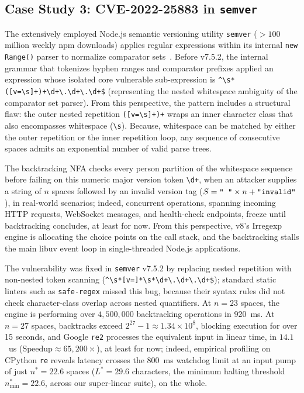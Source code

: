 \documentclass{ieeeaccess}
\begin{document}
\subsection{Case Study 3: CVE-2022-25883 in \texttt{semver}}
The extensively employed Node.js semantic versioning utility \texttt{semver} ($>100$ million weekly npm downloads) applies regular expressions within its internal \texttt{new Range()} parser to normalize comparator sets~\cite{cve_2022_25883}. Before v7.5.2, the internal grammar that tokenizes hyphen ranges and comparator prefixes applied an expression whose isolated core vulnerable sub-expression is \texttt{\^{}\textbackslash s*([v=\textbackslash s]+)+\textbackslash d+\textbackslash .\textbackslash d+\textbackslash .\textbackslash d+\$} (representing the nested whitespace ambiguity of the comparator set parser). From this perspective, the pattern includes a structural flaw: the outer nested repetition \texttt{([v=\textbackslash s]+)+} wraps an inner character class that also encompasses whitespace (\texttt{\textbackslash s}). Because, whitespace can be matched by either the outer repetition or the inner repetition loop, any sequence of consecutive spaces admits an exponential number of valid parse trees.

The backtracking NFA checks every person partition of the whitespace sequence before failing on this numeric major version token \texttt{\textbackslash d+}, when an attacker supplies a string of $n$ spaces followed by an invalid version tag ($S = \text{\texttt{" "}} \times n + \text{\texttt{"invalid"}}$), in real-world scenarios; indeed, concurrent operations, spanning incoming HTTP requests, WebSocket messages, and health-check endpoints, freeze until backtracking concludes, at least for now. From this perspective, v8's Irregexp engine is allocating the choice points on the call stack, and the backtracking stalls the main libuv event loop in single-threaded Node.js applications.

The vulnerability was fixed in \texttt{semver} v7.5.2 by replacing nested repetition with non-nested token scanning (\texttt{\^{}\textbackslash s*[v=]*\textbackslash s*\textbackslash d+\textbackslash .\textbackslash d+\textbackslash .\textbackslash d+\$}); standard static linters such as \texttt{safe-regex} missed this bug, because their syntax rules did not check character-class overlap across nested quantifiers. At $n = 23$ spaces, the engine is performing over $4{,}500{,}000$ backtracking operations in 920~ms. At $n = 27$ spaces, backtracks exceed $2^{27}-1 \approx 1.34 \times 10^8$, blocking execution for over 15 seconds, and Google \texttt{re2} processes the equivalent input in linear time, in $14.1$~us ($\mathrm{Speedup} \approx 65{,}200\times$), at least for now; indeed, empirical profiling on CPython \texttt{re} reveals latency crosses the 800~ms watchdog limit at an input pump of just $n^* = 22.6$ spaces ($L^* = 29.6$ characters, the minimum halting threshold $n^*_{\min} = 22.6$, across our super-linear suite), on the whole.
\end{document}
